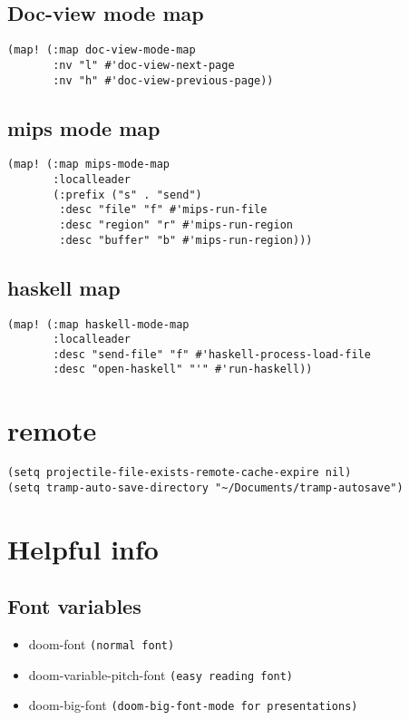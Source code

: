 \documentclass{assignments}
\begin{document}
\subsection*{Doc-view mode map}
\label{sec:org3d1e100}
\begin{verbatim}
(map! (:map doc-view-mode-map
       :nv "l" #'doc-view-next-page
       :nv "h" #'doc-view-previous-page))
\end{verbatim}
\subsection*{mips mode map}
\label{sec:orga1f1c7c}
\begin{verbatim}
(map! (:map mips-mode-map
       :localleader
       (:prefix ("s" . "send")
        :desc "file" "f" #'mips-run-file
        :desc "region" "r" #'mips-run-region
        :desc "buffer" "b" #'mips-run-region)))
\end{verbatim}
\subsection*{haskell map}
\label{sec:org916629d}
\begin{verbatim}
(map! (:map haskell-mode-map
       :localleader
       :desc "send-file" "f" #'haskell-process-load-file
       :desc "open-haskell" "'" #'run-haskell))
\end{verbatim}
\section*{remote}
\label{sec:org653c3e3}
\begin{verbatim}
(setq projectile-file-exists-remote-cache-expire nil)
(setq tramp-auto-save-directory "~/Documents/tramp-autosave")
\end{verbatim}

\section*{Helpful info}
\label{sec:orge1f8394}
\subsection*{Font variables}
\label{sec:org77cd603}
\begin{itemize}
\item doom-font \texttt{(normal font)}
\item doom-variable-pitch-font \texttt{(easy reading font)}
\item doom-big-font \texttt{(doom-big-font-mode for presentations)}
\end{itemize}
\end{document}
